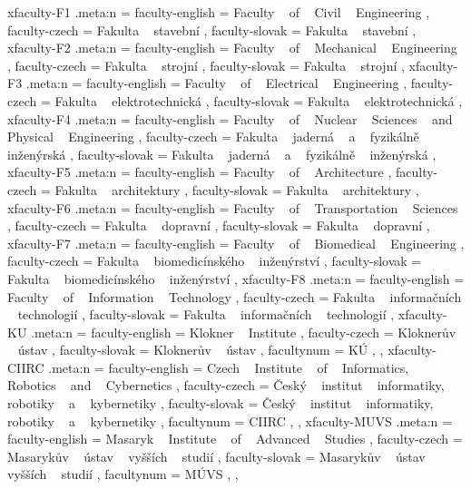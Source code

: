{	xfaculty-F1 .meta:n = {
		faculty-english = { Faculty ~ of ~ Civil ~ Engineering },
		faculty-czech = { Fakulta ~ stavební },
		faculty-slovak = { Fakulta ~ stavební }
	},
	xfaculty-F2 .meta:n = {
		faculty-english = { Faculty ~ of ~ Mechanical ~ Engineering },
		faculty-czech = { Fakulta ~ strojní },
		faculty-slovak = { Fakulta ~ strojní }
	},
	xfaculty-F3 .meta:n = {
		faculty-english = { Faculty ~ of ~ Electrical ~ Engineering },
		faculty-czech = { Fakulta ~ elektrotechnická },
		faculty-slovak = { Fakulta ~ elektrotechnická }
	},
	xfaculty-F4 .meta:n = {
		faculty-english = { Faculty ~ of ~ Nuclear ~ Sciences ~ and ~ Physical ~ Engineering },
		faculty-czech = { Fakulta ~ jaderná ~ a ~ fyzikálně ~ inženýrská },
		faculty-slovak = { Fakulta ~ jaderná ~ a ~ fyzikálně ~ inženýrská }
	},
	xfaculty-F5 .meta:n = {
		faculty-english = { Faculty ~ of ~ Architecture },
		faculty-czech = { Fakulta ~ architektury },
		faculty-slovak = { Fakulta ~ architektury }
	},
	xfaculty-F6 .meta:n = {
		faculty-english = { Faculty ~ of ~ Transportation ~ Sciences },
		faculty-czech = { Fakulta ~ dopravní },
		faculty-slovak = { Fakulta ~ dopravní }
	},
	xfaculty-F7 .meta:n = {
		faculty-english = { Faculty ~ of ~ Biomedical ~ Engineering },
		faculty-czech = { Fakulta ~ biomedicínského ~ inženýrství },
		faculty-slovak = { Fakulta ~ biomedicínského ~ inženýrství }
	},
	xfaculty-F8 .meta:n = {
		faculty-english = { Faculty ~ of ~ Information ~ Technology },
		faculty-czech = { Fakulta ~ informačních ~ technologií },
		faculty-slovak = { Fakulta ~ informačních ~ technologií }
	},
	xfaculty-KU .meta:n = {
		faculty-english = { Klokner ~ Institute },
		faculty-czech = { Kloknerův ~ ústav },
		faculty-slovak = { Kloknerův ~ ústav },
		facultynum = { KÚ },
	},
	xfaculty-CIIRC .meta:n = {
		faculty-english = { Czech ~ Institute ~ of ~ Informatics, ~ Robotics ~ and ~ Cybernetics },
		faculty-czech = { Český ~ institut ~ informatiky, ~ robotiky ~ a ~ kybernetiky },
		faculty-slovak = { Český ~ institut ~ informatiky, ~ robotiky ~ a ~ kybernetiky },
		facultynum = { CIIRC },
	},
	xfaculty-MUVS .meta:n = {
		faculty-english = { Masaryk ~ Institute ~ of ~ Advanced ~ Studies },
		faculty-czech = { Masarykův ~ ústav ~ vyšších ~ studií },
		faculty-slovak = { Masarykův ~ ústav ~ vyšších ~ studií },
		facultynum = { MÚVS },
	},

}






\endinput

